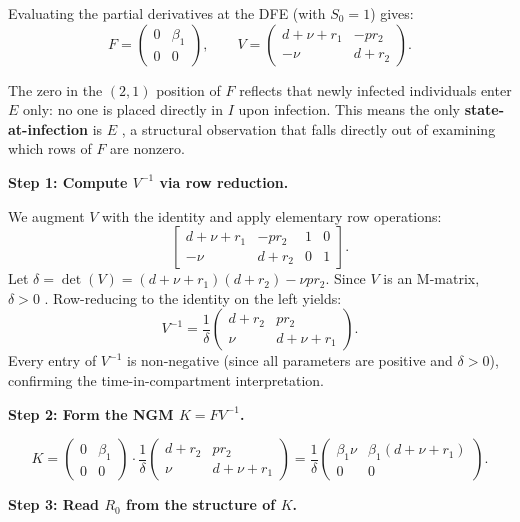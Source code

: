 \documentclass[12pt]{article}
\theoremstyle{plain}
\theoremstyle{definition}
\begin{document}
Evaluating the partial derivatives at the DFE (with $S_0 = 1$) gives:
\[
  F = \begin{pmatrix} 0 & \beta_1 \\ 0 & 0 \end{pmatrix}, \qquad
  V = \begin{pmatrix} d + \nu + r_1 & -pr_2 \\ -\nu & d + r_2 \end{pmatrix}.
\]

The zero in the $(2,1)$ position of $F$ reflects that newly infected individuals enter $E$
only: no one is placed directly in $I$ upon infection. This means the only
\textbf{state-at-infection} is $E$ \cite{diekmann2010}, a structural observation that falls
directly out of examining which rows of $F$ are nonzero.

\textbf{Step 1: Compute $V^{-1}$ via row reduction.}

We augment $V$ with the identity and apply elementary row operations:
\[
  \left[\begin{array}{cc|cc}
    d+\nu+r_1 & -pr_2 & 1 & 0 \\
    -\nu       & d+r_2 & 0 & 1
  \end{array}\right].
\]
Let $\delta = \det(V) = (d+\nu+r_1)(d+r_2) - \nu p r_2$. Since $V$ is an M-matrix,
$\delta > 0$ \cite{vddriessche2002}. Row-reducing to the identity on the left yields:
\[
  V^{-1} = \frac{1}{\delta}
  \begin{pmatrix} d + r_2 & pr_2 \\ \nu & d + \nu + r_1 \end{pmatrix}.
\]
Every entry of $V^{-1}$ is non-negative (since all parameters are positive and
$\delta > 0$), confirming the time-in-compartment interpretation.

\textbf{Step 2: Form the NGM $K = FV^{-1}$.}

\[
  K = \begin{pmatrix} 0 & \beta_1 \\ 0 & 0 \end{pmatrix}
      \cdot
      \frac{1}{\delta}\begin{pmatrix} d + r_2 & pr_2 \\ \nu & d + \nu + r_1 \end{pmatrix}
    = \frac{1}{\delta}
      \begin{pmatrix} \beta_1\nu & \beta_1(d+\nu+r_1) \\ 0 & 0 \end{pmatrix}.
\]

\textbf{Step 3: Read $R_0$ from the structure of $K$.}
\end{document}
